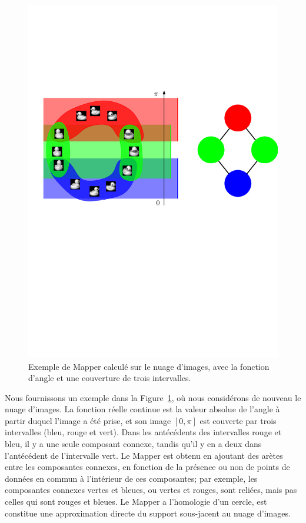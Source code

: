 \begin{figure}[h]\centering
\includegraphics[width=.75\textwidth]{figures/ExampleMapper}
\caption[Mapper calcul\'e sur des images]{\label{fig:mapperima}
Exemple de Mapper calcul\'e sur le nuage d'images, avec la fonction d'angle et une couverture de trois intervalles.}
\end{figure}


Nous fournissons un exemple dans la Figure~\ref{fig:mapperima}, o\`u nous consid\'erons de nouveau le nuage d'images. La fonction r\'eelle continue
est la valeur absolue de l'angle \`a partir duquel l'image a \'et\'e prise, et son image $[0,\pi]$ est couverte par trois intervalles (bleu, rouge et vert).
Dans les ant\'ec\'edents des intervalles rouge et bleu, il y a une seule composant connexe, tandis qu'il y en a deux dans l'ant\'ec\'edent de l'intervalle vert.
Le Mapper est obtenu en ajoutant des ar\`etes entre les composantes connexes, en fonction de la pr\'esence ou non de points de donn\'ees en commun \`a l'int\'erieur
de ces composantes; par exemple, les composantes connexes vertes et bleues, ou vertes et rouges, sont reli\'ees, mais pas celles qui sont rouges et bleues.
Le Mapper a l'homologie d'un cercle, est constitue une approximation directe du support sous-jacent au nuage d'images.

